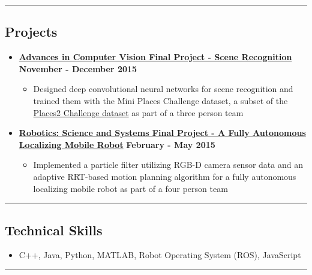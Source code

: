 \documentclass[10pt,letterpaper]{article}
\begin{document}
\hrule
\vspace{-0.6em}

\subsection*{Projects}
  \begin{itemize}
    \parskip=-0.1em
    
    \item[]
    {\href{http://6.869.csail.mit.edu/}{\textbf{Advances in Computer Vision Final Project - Scene Recognition}} \hfill
      \textbf{November - December 2015}}

    \begin{itemize}[label=\textbullet]
      \itemsep0em
      \item Designed deep convolutional neural networks for scene recognition and trained them with the Mini Places Challenge dataset, a subset of the \href{http://places2.csail.mit.edu/}{Places2 Challenge dataset} as part of a three person team
      \end{itemize}    
    
    \item[]
    {\href{http://courses.csail.mit.edu/rss/}{\textbf{Robotics: Science and Systems Final Project - A Fully Autonomous Localizing Mobile Robot}} \hfill
      \textbf{February - May 2015}}

    \begin{itemize}[label=\textbullet]
      \itemsep0em
      \item Implemented a particle filter utilizing RGB-D camera sensor data and an adaptive RRT-based motion planning algorithm for a fully autonomous localizing mobile robot as part of a four person team
      \end{itemize}    
\end{itemize}

\hrule
\vspace{-0.6em}

\subsection*{Technical Skills}
\begin{itemize}
	\item[] C++, Java, Python, MATLAB, Robot Operating System (ROS), JavaScript
\end{itemize}

\hrule
\vspace{-0.6em}
\end{document}
